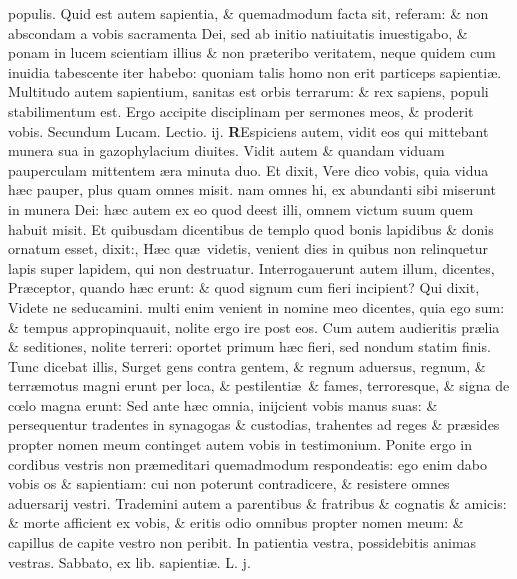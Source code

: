 \documentclass[a5paper,10pt]{book}
\def\rightmarginnote{%
	\lrmarginnote{\hskip\columnwidth \hskip -1em}}
\def\ae{æ}
\def\oe{œ}
\begin{document}
\begin{multicols*}{2}
populis.
Quid est autem sapientia, \& quemadmodum facta sit, referam: \& non abscondam a vobis sacramenta Dei, sed ab initio natiuitatis inuestigabo, \& ponam in lucem scientiam illius \& non pr\ae teribo veritatem, neque quidem cum inuidia tabescente iter habebo: quoniam talis homo non erit particeps sapienti\ae .
Multitudo autem sapientium, sanitas est orbis terrarum: \& rex sapiens, populi stabilimentum est. Ergo accipite disciplinam per sermones meos, \& proderit vobis.
\newline \color{red} Secundum Lucam. \hfill Lectio. ij. \color{black}
\vspace{-.25em}
\lettrine[lines=2]{\bfseries \color{red} R}{}Espiciens\rightmarginnote{c. 21.} autem, vidit eos qui mittebant munera sua in gazophylacium diuites.
Vidit autem \& quandam viduam pauperculam mittentem \ae ra minuta duo. Et dixit, Vere dico vobis, quia vidua h\ae c pauper, plus quam omnes misit. nam omnes hi, ex abundanti sibi miserunt in munera Dei: h\ae c autem ex eo quod deest illi, omnem victum suum quem habuit misit.
Et quibusdam dicentibus de templo quod bonis lapidibus \& donis ornatum esset, dixit:, H\ae c qu\ae \ videtis, venient dies in quibus non relinquetur lapis super lapidem, qui non destruatur.
Interrogauerunt autem illum, dicentes, Pr\ae ceptor, quando h\ae c erunt: \& quod signum cum fieri incipient?
Qui dixit, Videte ne seducamini. multi enim venient in nomine meo dicentes, quia ego sum: \& tempus appropinquauit, nolite ergo ire post eos.
Cum autem audieritis pr\ae lia \& seditiones, nolite terreri: oportet primum h\ae c fieri, sed nondum statim finis.
Tunc dicebat illis, Surget gens contra gentem, \& regnum aduersus, regnum, \& terr\ae motus magni erunt per loca, \& pestilenti\ae \ \& fames, terroresque, \& signa de c\oe lo magna erunt: Sed ante h\ae c omnia, inijcient vobis manus suas: \& persequentur tradentes in synagogas \& custodias, trahentes ad reges \& pr\ae sides propter nomen meum continget autem vobis in testimonium.
Ponite ergo in cordibus vestris non pr\ae meditari quemadmodum respondeatis: ego enim dabo vobis os \& sapientiam: cui non poterunt contradicere, \& resistere omnes aduersarij vestri.
Trademini autem a parentibus \& fratribus \& cognatis \& amicis: \& morte afficient ex vobis, \& eritis odio omnibus propter nomen meum: \& capillus de capite vestro non peribit.
In patientia vestra, possidebitis animas vestras.
\newline {} \color{red} \hypertarget{SAT-TERTIA-POST-ADV}{Sabbato,} ex lib. sapienti\ae . L. j. \color{black}

\end{multicols*}
\end{document}

